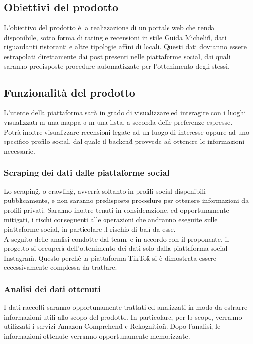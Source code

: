 \subsection{Obiettivi del prodotto}
L'obiettivo del prodotto è la realizzazione di un portale web che renda disponibile, sotto forma di rating e recensioni in stile Guida Michelin\G{}, dati riguardanti 
ristoranti e altre tipologie affini di locali. 
Questi dati dovranno essere estrapolati direttamente dai post presenti nelle piattaforme social, dai quali saranno predisposte procedure automatizzate per l'ottenimento degli stessi.

\subsection{Funzionalità del prodotto}
L'utente della piattaforma sarà in grado di visualizzare ed interagire con i luoghi visualizzati in una mappa o in una lista, a seconda delle preferenze espresse.
Potrà inoltre visualizzare recensioni legate ad un luogo di interesse oppure ad uno specifico profilo social, dal quale il backend\G{} provvede ad ottenere le informazioni necessarie.

\subsubsection{Scraping dei dati dalle piattaforme social}
Lo scraping\G{}, o crawling\G{}, avverrà soltanto in profili social disponibili pubblicamente, e non saranno predisposte procedure per ottenere informazioni da profili privati.
Saranno inoltre tenuti in considerazione, ed opportunamente mitigati, i rischi conseguenti alle operazioni che andranno eseguite sulle piattaforme social, in particolare il rischio di ban\G{} da esse.\\
A seguito delle analisi condotte dal team, e in accordo con il proponente, il progetto si occuperà dell'ottenimento dei dati solo dalla piattaforma social Instagram\G{}. Questo perchè la piattaforma TikTok\G{} si è dimostrata essere eccessivamente complessa da trattare.

\subsubsection{Analisi dei dati ottenuti}
I dati raccolti saranno opportunamente trattati ed analizzati in modo da estrarre informazioni utili allo scopo del prodotto. 
In particolare, per lo scopo, verranno utilizzati i servizi Amazon Comprehend\G{} e Rekognition\G{}.
Dopo l'analisi, le informazioni ottenute verranno opportunamente memorizzate.

